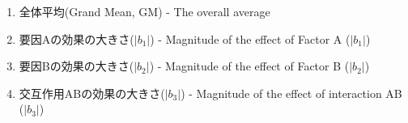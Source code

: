 \begin{enumerate}
	\item 全体平均(Grand Mean, GM) - The overall average
	\item 要因Aの効果の大きさ($|b_1|$) - Magnitude of the effect of Factor A ($|b_1|$)
	\item 要因Bの効果の大きさ($|b_2|$) - Magnitude of the effect of Factor B ($|b_2|$)
	\item 交互作用ABの効果の大きさ($|b_3|$) - Magnitude of the effect of interaction AB ($|b_3|$)
\end{enumerate}
